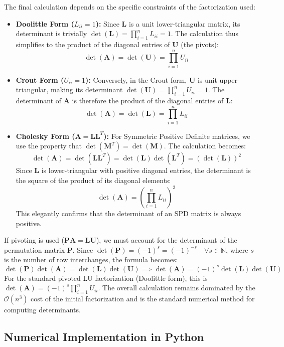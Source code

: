The final calculation depends on the specific constraints of the factorization used:

\begin{itemize}
    \item \textbf{Doolittle Form ($L_{ii} = 1$):} Since $\mathbf{L}$ is a unit lower-triangular matrix, its determinant is trivially $\det(\mathbf{L}) = \prod_{i=1}^n L_{ii} = 1$. The calculation thus simplifies to the product of the diagonal entries of $\mathbf{U}$ (the pivots):
    \[ \det(\mathbf{A}) = \det(\mathbf{U}) = \prod_{i=1}^n U_{ii} \]

    \item \textbf{Crout Form ($U_{ii} = 1$):} Conversely, in the Crout form, $\mathbf{U}$ is unit upper-triangular, making its determinant $\det(\mathbf{U}) = \prod_{i=1}^n U_{ii} = 1$. The determinant of $\mathbf{A}$ is therefore the product of the diagonal entries of $\mathbf{L}$:
    \[ \det(\mathbf{A}) = \det(\mathbf{L}) = \prod_{i=1}^n L_{ii} \]

    \item \textbf{Cholesky Form ($\mathbf{A} = \mathbf{L}\mathbf{L}^T$):} For Symmetric Positive Definite matrices, we use the property that $\det(\mathbf{M}^T) = \det(\mathbf{M})$. The calculation becomes:
    \[ \det(\mathbf{A}) = \det(\mathbf{L}\mathbf{L}^T) = \det(\mathbf{L})\det(\mathbf{L}^T) = (\det(\mathbf{L}))^2 \]
    Since $\mathbf{L}$ is lower-triangular with positive diagonal entries, the determinant is the square of the product of its diagonal elements:
    \[ \det(\mathbf{A}) = \left(\prod_{i=1}^n L_{ii}\right)^2 \]
    This elegantly confirms that the determinant of an SPD matrix is always positive.
\end{itemize}

If pivoting is used ($\mathbf{P}\mathbf{A} = \mathbf{L}\mathbf{U}$), we must account for the determinant of the permutation matrix $\mathbf{P}$. Since $\det(\mathbf{P}) = (-1)^s = (-1)^{-s} \quad \forall s \in \mathbb{N}$, where $s$ is the number of row interchanges, the formula becomes:
\[ \det(\mathbf{P})\det(\mathbf{A}) = \det(\mathbf{L})\det(\mathbf{U}) \implies \det(\mathbf{A}) = (-1)^s \det(\mathbf{L})\det(\mathbf{U}) \]
For the standard pivoted LU factorization (Doolittle form), this is $\det(\mathbf{A}) = (-1)^s \prod_{i=1}^n U_{ii}$. The overall calculation remains dominated by the $\mathcal{O}(n^3)$ cost of the initial factorization and is the standard numerical method for computing determinants.

\subsection{Numerical Implementation in Python}

